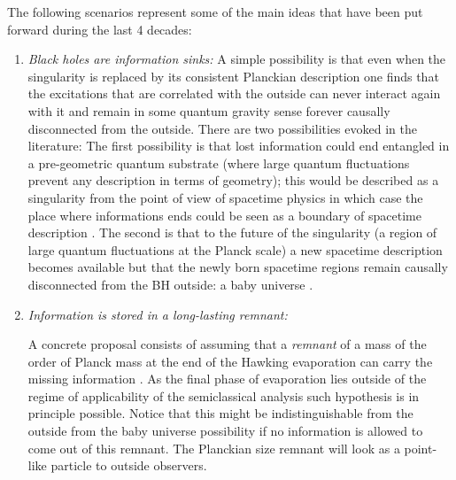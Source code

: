 \documentclass[aps, nofootinbib,superscriptaddress,12pt]{revtex4-2}
\begin{document}
The following scenarios represent some of the main ideas that have been put forward during the last 4 decades:
\begin{enumerate}
 \item {\em Black holes are information sinks:} A simple possibility is that even when the singularity is replaced by its consistent Planckian 
 description one finds that the excitations that are correlated with the outside can never interact again with it and remain in some quantum gravity sense forever causally disconnected from the outside.  There are two possibilities evoked in the literature: The first possibility is that lost information could end entangled in a pre-geometric quantum substrate (where large quantum fluctuations \cite{Ashtekar:1996yk} prevent any description in terms of geometry); this would be described as a singularity from the point of view of spacetime physics in which case the place where informations ends could be seen as a boundary of spacetime description \cite{Wald2001}. The second is that to the future of the singularity (a region of large quantum fluctuations at the Planck scale) a new spacetime description becomes available but that the 
 newly born spacetime regions remain causally disconnected from the BH outside: a baby universe \cite{Frolov:1989pf, Frolov:1988vj}. 
 
 


\item {\em Information is stored in a long-lasting remnant:} 
  
 A concrete proposal consists of assuming that a {\em remnant} of a mass of the order of Planck mass at the end of the Hawking evaporation can carry the missing information \cite{Aharonov:1987tp, Giddings:1992hh}.
As the final phase of evaporation lies outside of the regime of applicability of the semiclassical
analysis such hypothesis is in principle possible.  Notice that this might be indistinguishable from the outside from the baby universe possibility if no information is allowed to come out of this remnant.  The Planckian size remnant will  look as a point-like particle to outside observers.


\end{enumerate}
\end{document}
